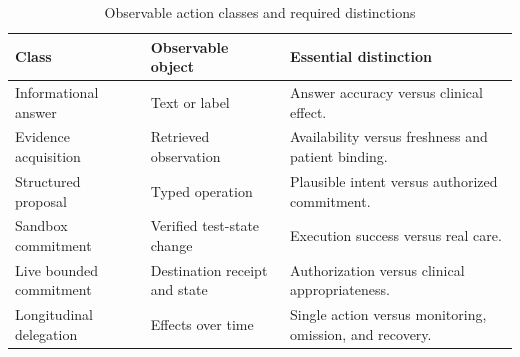 \begin{table}[t]\caption{Observable action classes and required distinctions}\label{tab:actions}\centering\footnotesize
\begin{tabularx}{\columnwidth}{@{}p{}YY@{}}\toprule
Class & Observable object & Essential distinction \\ \midrule
Informational answer & Text or label & Answer accuracy versus clinical effect.\\
Evidence acquisition & Retrieved observation & Availability versus freshness and patient binding.\\
Structured proposal & Typed operation & Plausible intent versus authorized commitment.\\
Sandbox commitment & Verified test-state change & Execution success versus real care.\\
Live bounded commitment & Destination receipt and state & Authorization versus clinical appropriateness.\\
Longitudinal delegation & Effects over time & Single action versus monitoring, omission, and recovery.\\ \bottomrule
\end{tabularx}\end{table}
